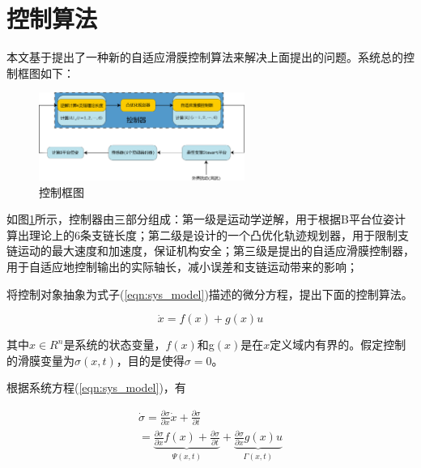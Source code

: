 \section{控制算法}

本文基于\cite{plestanNewMethodologiesAdaptive2010}提出了一种新的自适应滑膜控制算法来解决上面提出的问题。系统总的控制框图如下：

\begin{figure}[H]
    \centering
    \includegraphics[width=0.6\textwidth]{./imgs/control_model.png}
    \caption{控制框图}
    \label{fig:control_model}
\end{figure}

如图\ref{fig:control_model}所示，控制器由三部分组成：第一级是运动学逆解，用于根据B平台位姿计算出理论上的6条支链长度；第二级是设计的一个凸优化轨迹规划器，用于限制支链运动的最大速度和加速度，保证机构安全；第三级是提出的自适应滑膜控制器，用于自适应地控制输出的实际轴长，减小误差和支链运动带来的影响；

将控制对象抽象为式子(\ref{eqn:sys_model})描述的微分方程，提出下面的控制算法。

\begin{equation}
    \dot{x}=f\left( x \right) +g\left( x \right) u
    \label{eqn:sys_model}
\end{equation}

其中$x\in R^n$是系统的状态变量，$f(x)$和g$(x)$是在$x$定义域内有界的。假定控制的滑膜变量为$\sigma(x,t)$，目的是使得$\sigma=0$。

根据系统方程(\ref{eqn:sys_model})，有

\begin{equation}
    \begin{array}{c}
        \dot{\sigma}=\frac{\partial \sigma}{\partial x}\dot{x}+\frac{\partial \sigma}{\partial t}\\
        =\underset{\varPsi \left( x,t \right)}{\underbrace{\frac{\partial \sigma}{\partial x}f\left( x \right) +\frac{\partial \sigma}{\partial t}}}+\underset{\varGamma \left( x,t \right)}{\underbrace{\frac{\partial \sigma}{\partial x}g\left( x \right) u}}\\
    \end{array}
\end{equation}

